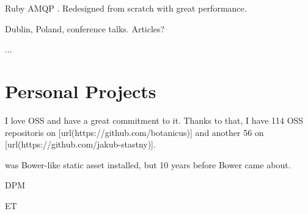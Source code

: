 \startitemize
  \item Ruby AMQP . Redesigned from scratch with great performance.
  \item Dublin, Poland, conference talks. Articles?
  \item ...
\stopitemize

\blank \section{Personal Projects}
I love OSS and have a great commitment to it.
Thanks to that, I have 114 OSS repositoris on [url(https://github.com/botanicus)] and another 56 on [url(https://github.com/jakub-stastny)].


\startitemize
  \item \from[pupu][P] was Bower-like static asset installed, but 10 years before Bower came about.

  \item DPM
  \item ET
\stopitemize


